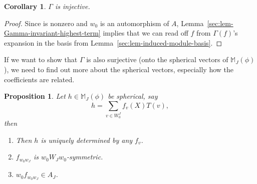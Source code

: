 \documentclass[pdftex]{sigma}
\newtheorem{Proposition}[Theorem]{Proposition}
\newtheorem{Corollary}[Theorem]{Corollary}
\theoremstyle{definition}
\numberwithin{equation}{section}
\begin{document}
\begin{Corollary}\label{sec:cor-Gamma-injective}
 $\Gamma$ is injective.
\end{Corollary}
\begin{proof}
 Since  is nonzero and
 $w_0$ is an automorphism of $A$, Lemma~\ref{sec:lem-Gamma-invariant-highest-term} implies that we can read off $f$ from $\Gamma(f)$'s
 expansion in the basis from Lemma~\ref{sec:lem-induced-module-basis}.
\end{proof}

If we want to show that $\Gamma$ is also surjective (onto the spherical
vectors of $\mathbb{M}_J(\phi)$), we need to find out more about the
spherical vectors, especially how the coefficients are related.

\begin{Proposition}\label{sec:prop-Gamma-properties}
 Let $h\in\mathbb{M}_J(\phi)$ be spherical, say
 \[
 h = \sum_{v\in W_0^J} f_v(X) T(v),
 \]
 then
 \begin{enumerate}\itemsep=0pt
 \item[$(i)$] Then $h$ is uniquely determined by any $f_v$.
 \item[$(ii)$] $f_{w_0w_J}$ is $w_0 W_J w_0$-symmetric.
 \item[$(iii)$] $w_0 f_{w_0 w_J}\in A_J$.
 \end{enumerate}
\end{Proposition}
\end{document}
